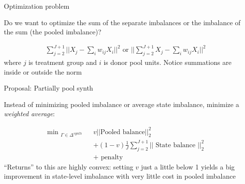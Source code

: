 \documentclass{beamer}
\begin{document}
\begin{frame}{Optimization problem}

Do we want to optimize the sum of the separate imbalances or the imbalance of the sum (the pooled imbalance)?

\begin{eqnarray*}
\sum_{j=2}^{J+1} || X_j - \sum_i w_{ij}X_i ||^2\textrm{   or  } ||\sum_{j=2}^{J+1} X_j - \sum_i w_{ij} X_i ||^2
\end{eqnarray*}where $j$ is treatment group and $i$ is donor pool units. Notice summations are inside or outside the norm
\end{frame}













\begin{frame}{Proposal: Partially pool synth}

Instead of minimizing pooled imbalance or average state imbalance, minimize a \emph{weighted average}:

\begin{eqnarray*}
\textrm{min  }_{\Gamma \in \Delta^{synth}}  &&v|| \textrm{Pooled balance} ||^2_2 \\
&&+ (1-v) \frac{1}{J} \sum_{j=2}^{J+1} ||\textrm{ State balance } ||^2_2 \\
&&+ \textrm{ penalty }
\end{eqnarray*}``Returns'' to this are highly convex: setting $v$ just a little below 1 yields a big improvement in state-level imbalance with very little cost in pooled imbalance

\end{frame}
\end{document}
